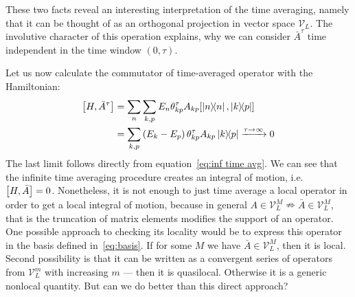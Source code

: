 These two facts reveal an interesting interpretation of the time averaging, namely that it can be
thought of as an orthogonal projection in vector space \(\mathcal{V}_L\). The involutive character of this operation explains,
why we can consider \(\bar{A}^{\tau}\) time independent in the time window \(\left(0,\tau\right)\).

Let us now calculate the commutator of time-averaged operator with the Hamiltonian:
\begin{align}
  \comm{H}{\bar{A}^{\tau}} & = \sum_n \sum_{k,p} E_n \theta_{kp}^{\tau} A_{kp} \comm{ \ketbra{n}{n}}{ \ketbra{k}{p}} \nonumber         \\
                           & = \sum_{k,p} \left(E_k-E_p\right) \theta_{kp}^{\tau} A_{kp} \ketbra{k}{p} \xrightarrow{\tau \to \infty} 0 \label{eq:time averaged commutator}
\end{align}
The last limit follows directly from equation~\eqref{eq:inf time avg}. We can see that the infinite time averaging procedure
creates an integral of motion, i.e. \(\comm{H}{\bar{A}} = 0\). Nonetheless, it is not enough to just time average a
local operator in order to get a local integral of motion, because in general \(A\in \mathcal{V}_L^M  \nRightarrow \bar{A} 
\in \mathcal{V}_L^M\), that is the truncation of matrix elements modifies the support of an operator.
One possible approach to checking its locality would be to
express this operator in the basis defined in~\eqref{eq:basis}. If for some \(M\) we have \(\bar{A}\in \mathcal{V}_L^M\),
then it is local. Second possibility is that it can be written as a convergent series of operators from \(\mathcal{V}_L^m\) with
increasing \(m\) --- then it is quasilocal. Otherwise it is a generic nonlocal quantity. But can we do better than this
direct approach?

